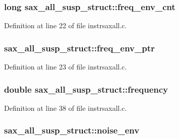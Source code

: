 \subsubsection[{\texorpdfstring{freq\+\_\+env\+\_\+cnt}{freq_env_cnt}}]{\setlength{\rightskip}{0pt plus 5cm}long sax\+\_\+all\+\_\+susp\+\_\+struct\+::freq\+\_\+env\+\_\+cnt}\hypertarget{structsax__all__susp__struct_a88121c49c7a0ff572ef5cd781130fcb1}{}\label{structsax__all__susp__struct_a88121c49c7a0ff572ef5cd781130fcb1}


Definition at line 22 of file instrsaxall.\+c.

\subsubsection[{\texorpdfstring{freq\+\_\+env\+\_\+ptr}{freq_env_ptr}}]{ sax\+\_\+all\+\_\+susp\+\_\+struct\+::freq\+\_\+env\+\_\+ptr}\hypertarget{structsax__all__susp__struct_a11190a67226e970e4b4c0d0fcd4fe744}{}\label{structsax__all__susp__struct_a11190a67226e970e4b4c0d0fcd4fe744}


Definition at line 23 of file instrsaxall.\+c.

\subsubsection[{\texorpdfstring{frequency}{frequency}}]{\setlength{\rightskip}{0pt plus 5cm}double sax\+\_\+all\+\_\+susp\+\_\+struct\+::frequency}\hypertarget{structsax__all__susp__struct_a7d59d64f8166f856788da2d10939ed44}{}\label{structsax__all__susp__struct_a7d59d64f8166f856788da2d10939ed44}


Definition at line 38 of file instrsaxall.\+c.

\subsubsection[{\texorpdfstring{noise\+\_\+env}{noise_env}}]{ sax\+\_\+all\+\_\+susp\+\_\+struct\+::noise\+\_\+env}\hypertarget{structsax__all__susp__struct_ae4c993c36179cc4d0f6c319f86007f02}{}\label{structsax__all__susp__struct_ae4c993c36179cc4d0f6c319f86007f02}



